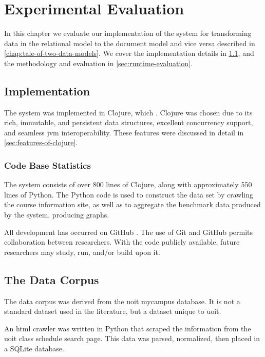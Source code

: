 \chapter{Experimental Evaluation}
\label{chap:experimental-evaluation}
	In this chapter we evaluate our implementation of the system for transforming data in the relational model to the document model and vice versa described in \cref{chap:tale-of-two-data-models}.  We cover the implementation details in \cref{sec:implementation}, and the methodology and evaluation in \cref{sec:runtime-evaluation}.
	
	\section{Implementation}
	\label{sec:implementation}
		The system was implemented in Clojure, which .  Clojure was chosen due to its rich, immutable, and persistent data structures, excellent concurrency support, and seamless \gls{jvm} interoperability.  These features were discussed in detail in \cref{sec:features-of-clojure}.
		
		\subsection{Code Base Statistics}
			The system consists of over 800 lines of Clojure, along with approximately 550 lines of Python.  The Python code is used to construct the data set by crawling the course information site, as well as to aggregate the benchmark data produced by the system, producing graphs.
			
			All development has occurred on GitHub \cite{molly-repo}.  The use of Git and GitHub permits collaboration between researchers.  With the code publicly available, future researchers may study, run, and/or build upon it.
	
	\section{The Data Corpus}
	\label{sec:data-corpus}
		The data corpus was derived from the \gls{uoit} mycampus database.  It is not a standard dataset used in the literature, but a dataset unique to \gls{uoit}.
		
		An \gls{html} crawler was written in Python that scraped the information from the \gls{uoit} class schedule search page.  This data was parsed, normalized, then placed in a SQLite database.
		
